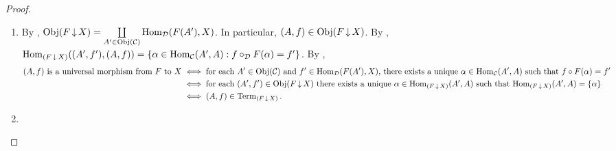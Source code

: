 \documentclass{book}
\begin{document}
	\begin{proof}\
		\begin{enumerate}
			\item By , $\operatorname{Obj}(F \operatorname{\downarrow} X) = \coprod\limits_{A' \in \operatorname{Obj}(\mathcal{C})} \operatorname{Hom}_{\mathcal{D}}(F(A'), X)$. In particular, $(A,f) \in \operatorname{Obj}(F \operatorname{\downarrow} X)$. By , $\operatorname{Hom}_{(F \operatorname{\downarrow} X)}((A', f'), (A,f)) = \{\alpha \in \operatorname{Hom}_{\mathcal{C}}(A', A): f \circ_{\mathcal{D}} F(\alpha) = f'\}$. By ,
			\begin{align*}
				\text{$(A, f)$ is a universal morphism from $F$ to $X$}
				& \iff \text{for each $A' \in \operatorname{Obj}(\mathcal{C})$ and $f' \in \operatorname{Hom}_{\mathcal{D}}(F(A'), X)$, there exists a unique $\alpha \in \operatorname{Hom}_{\mathcal{C}}(A', A)$ such that $f \circ F(\alpha) = f'$} \\
				& \iff \text{for each $(A', f') \in \operatorname{Obj}(F \operatorname{\downarrow} X)$ there exists a unique $\alpha \in \operatorname{Hom}_{(F \operatorname{\downarrow} X)}(A', A)$ such that $\operatorname{Hom}_{(F \operatorname{\downarrow} X)}(A', A) = \{\alpha\}$} \\
				& \iff (A,f) \in \operatorname{\text{Term}}_{(F \operatorname{\downarrow} X)}.
			\end{align*}
			\item {}
		\end{enumerate}
	\end{proof}
	
	\begin{note}
	\end{note}
	
	
	
	
	
	
	
	
	
	
	
	
	
	
	
	
	
	
	
	
	
	
	
	
	
	
	
	
	
	
	
	
	
	
	
	
	
	
	
\end{document}
